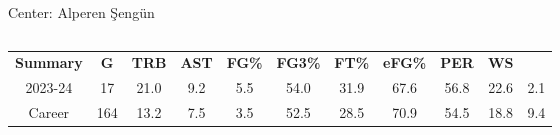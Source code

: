 \begin{frame}{Center: Alperen Şengün}
    \pause
    \begin{columns}
        \begin{column}{0.4\textwidth}
            \begin{table}[h]
                \small
                \centering
                \begin{tabular}{ c|cccc|cccc|cc }
                    \textbf{Summary} & \textbf{G} &\textbf{TRB} &\textbf{AST} & \textbf{FG\%} & \textbf{FG3\%} &\textbf{FT\%} &\textbf{eFG\%} & \textbf{PER} & \textbf{WS} \\
                    2023-24 & 17 & 21.0 & 9.2 & 5.5 & 54.0 & 31.9 & 67.6 & 56.8 & 22.6 & 2.1 \\
                    \pause
                    Career & 164 & 13.2 & 7.5 & 3.5 & 52.5 & 28.5 & 70.9 & 54.5 & 18.8 & 9.4 \\
                \end{tabular}
                \label{fig:player-statistics}
            \end{table}
        \end{column}
        \begin{column}{0.3\textwidth}
            \begin{figure}[t]
                \vspace{-14em}
                \label{fig:Jalen-Green}
            \end{figure}
        \end{column}
    \end{columns}
\end{frame}


